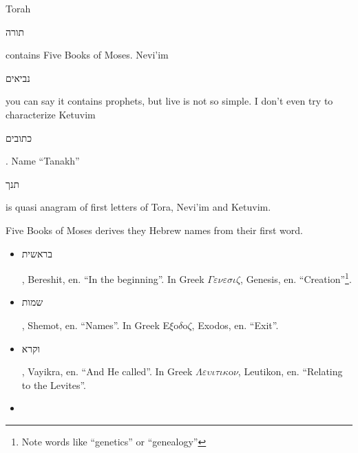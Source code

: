 \documentclass[a4paper,11pt]{article}
\begin{document}
Torah \begin{hebrew} תורה \end{hebrew} contains Five Books of Moses. Nevi'im
\begin{hebrew} נביאים \end{hebrew} you can say it contains
prophets, but live is not so simple. I don't even try to characterize
Ketuvim \begin{hebrew} כתובים \end{hebrew}. Name ``Tanakh''
\begin{hebrew} תנך \end{hebrew} is quasi anagram of first letters of Tora,
Nevi'im and Ketuvim.

Five Books of Moses derives they Hebrew names from their first word.
\begin{itemize}

\item \begin{hebrew} בראשית \end{hebrew}, Bereshit, en. ``In the beginning''.
  In Greek $\Gamma \varepsilon \nu \varepsilon \sigma \iota \zeta$, Genesis, en. ``Creation''\footnote{Note words
    like ``genetics'' or ``genealogy''}.

\item \begin{hebrew} שמות \end{hebrew}, Shemot, en. ``Names''. In Greek E$\xi$o$\delta$o$\zeta$, Exodos, en. ``Exit''.

\item \begin{hebrew} וקרא \end{hebrew}, Vayikra, en. ``And He called''. In Greek $\Lambda \varepsilon \upsilon \iota \tau \iota \kappa$o$\nu$, Leutikon, en. ``Relating to the Levites''.

\item \begin{hebrew} \end{hebrew}

\end{itemize}
\end{document}
